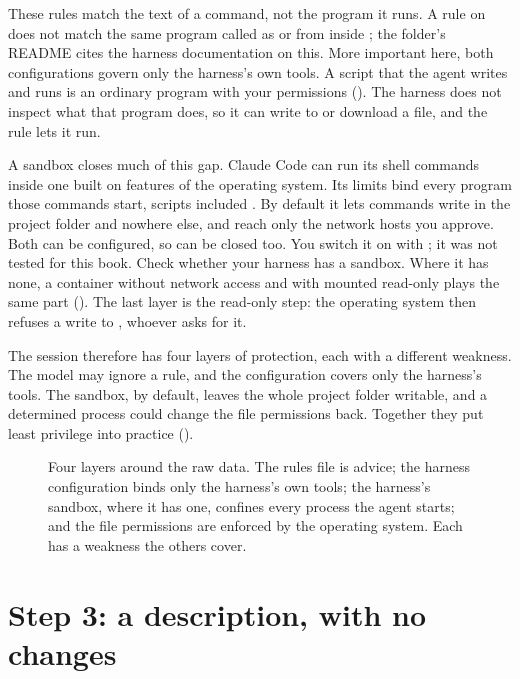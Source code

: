 These rules match the text of a command, not the program it runs. A rule on
 does not match the same program called as 
or from inside ; the folder's README cites the harness
documentation on this. More important here, both configurations govern only the harness's own tools. A
script that the agent writes and runs is an ordinary program with your
permissions (). The harness does not inspect what that
program does, so it can write to  or download a file, and the
 rule lets it run.

A sandbox closes much of this gap. Claude Code can run its shell commands
inside one built on features of the operating system. Its limits bind every
program those commands start, scripts included \parencite{anthropic2025sandboxing}.
By default it lets commands write in the project folder and nowhere else, and
reach only the network hosts you approve. Both can be configured, so
 can be closed too. You switch it on with ; it
was not tested for this book. Check whether your harness has a sandbox. Where
it has none, a container without network access and with 
mounted read-only plays the same part (). The last
layer is the read-only step: the operating system then refuses a write to
, whoever asks for it.

The session therefore has four layers of protection, each with a different
weakness. The model may ignore a rule, and the configuration covers only the
harness's tools. The sandbox, by default, leaves the whole project folder
writable, and a determined process could change the file permissions back.
Together they put least privilege into practice ().

\begin{figure}[htbp]
\centering
{}
\caption{Four layers around the raw data. The rules file is advice; the
harness configuration binds only the harness's own tools; the harness's
sandbox, where it has one, confines every process the agent starts; and the
file permissions are enforced by the operating system. Each has a weakness
the others cover.}
\label{fig:sessionlayers}
\end{figure}

\section{Step 3: a description, with no changes}

